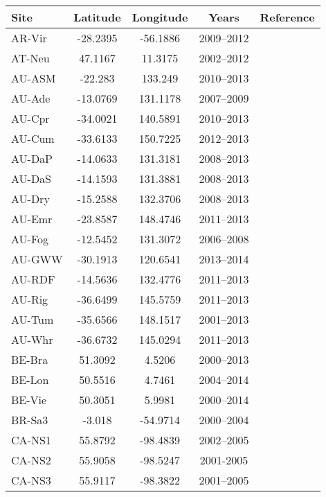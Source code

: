 \begin{longtable}{lcccc} 
\toprule
Site & Latitude & Longitude & Years & Reference \\
\midrule
AR-Vir &  -28.2395 &  -56.1886 &  2009–2012 &  \cite{Posse2016}\\
AT-Neu &  47.1167 &  11.3175 &  2002–2012 &  \cite{Wohlfahrt2008}\\
AU-ASM &  -22.283 &  133.249 &  2010–2013 &  \cite{Eamus2013}\\
AU-Ade &  -13.0769 &  131.1178 &  2007–2009 &  \cite{Beringer2011}\\
AU-Cpr &  -34.0021 &  140.5891 &  2010–2013 &  \cite{Karan2016}\\
AU-Cum &  -33.6133 &  150.7225 &  2012–2013 &  \cite{Karan2016}\\
AU-DaP &  -14.0633 &  131.3181 &  2008–2013 &  \cite{Beringer2011}\\
AU-DaS &  -14.1593 &  131.3881 &  2008–2013 &  \cite{Beringer2011}\\
AU-Dry &  -15.2588 &  132.3706 &  2008–2013 &  \cite{Beringer2011}\\
AU-Emr &  -23.8587 &  148.4746 &  2011–2013 &  \cite{Schroder2014}\\
AU-Fog &  -12.5452 &  131.3072 &  2006–2008 &  \cite{Beringer2011}\\
AU-GWW &  -30.1913 &  120.6541 &  2013–2014 &  \cite{Prober2012}\\
AU-RDF &  -14.5636 &  132.4776 &  2011–2013 &  \cite{Beringer2011}\\
AU-Rig &  -36.6499 &  145.5759 &  2011–2013 &  \cite{Beringer2011}\\
AU-Tum &  -35.6566 &  148.1517 &  2001–2013 &  \cite{Leuning2005}\\
AU-Whr &  -36.6732 &  145.0294 &  2011–2013 &  \cite{Karan2016}\\
BE-Bra &  51.3092 &  4.5206 &  2000–2013 &  \cite{Carrara2003}\\
BE-Lon &  50.5516 &  4.7461 &  2004–2014 &  \cite{Moureaux2006}\\
BE-Vie &  50.3051 &  5.9981 &  2000–2014 &  \cite{Aubinet2001}\\
BR-Sa3 &  -3.018 &  -54.9714 &  2000–2004 &  \cite{Miller2004}\\
CA-NS1 &  55.8792 &  -98.4839 &  2002–2005 &  \cite{Goulden2006}\\
CA-NS2 & 55.9058 & -98.5247 & 2001-2005 & \cite{Goulden2006}\\
CA-NS3 &  55.9117 &  -98.3822 &  2001–2005 &  \cite{Goulden2006}\\

\end{longtable}
